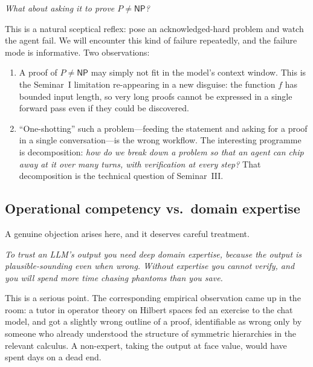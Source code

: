 \begin{audience}
  \emph{What about asking it to prove $P \neq \textsf{NP}$?}

  This is a natural sceptical reflex: pose an
  acknowledged-hard problem and watch the agent fail.  We
  will encounter this kind of failure repeatedly, and the
  failure mode is informative.  Two observations:
  \begin{enumerate}[(1)]
    \item A proof of $P \neq \textsf{NP}$ may simply not fit
      in the model's context window.  This is the
      Seminar~I limitation re-appearing in a new disguise:
      the function $f$ has bounded input length, so very
      long proofs cannot be expressed in a single forward
      pass even if they could be discovered.
    \item ``One-shotting'' such a problem---feeding the
      statement and asking for a proof in a single
      conversation---is the wrong workflow.  The interesting
      programme is decomposition: \emph{how do we break
      down a problem so that an agent can chip away at it
      over many turns, with verification at every step?}
      That decomposition is the technical question of
      Seminar~III.
  \end{enumerate}
\end{audience}

\subsection{Operational competency vs.\ domain expertise}

A genuine objection arises here, and it deserves careful
treatment.

\begin{audience}
  \emph{To trust an LLM's output you need deep domain
  expertise, because the output is plausible-sounding even
  when wrong.  Without expertise you cannot verify, and you
  will spend more time chasing phantoms than you save.}
\end{audience}

This is a serious point.  The corresponding empirical
observation came up in the room: a tutor in operator theory
on Hilbert spaces fed an exercise to the chat model, and
got a slightly wrong outline of a proof, identifiable as
wrong only by someone who already understood the structure
of symmetric hierarchies in the relevant calculus.  A
non-expert, taking the output at face value, would have
spent days on a dead end.

